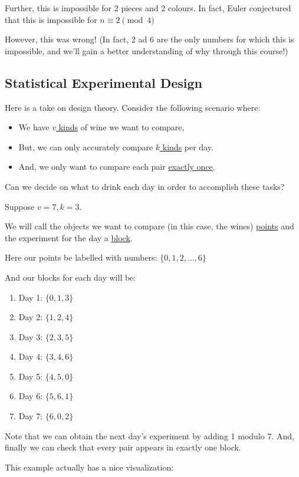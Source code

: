 Further, this is impossible for 2 pieces and 2 colours.
In fact, Euler conjectured that this is impossible for $n \equiv 2 \pmod{4}$

However, this was wrong! (In fact, 2 ad 6 are the only numbers for which this is impossible, and we'll gain a better understanding of why through this course!)

\subsection{Statistical Experimental Design}
Here is a take on design theory.
Consider the following scenario where:
\begin{itemize}
    \item We have \ul{$v$ kinds} of wine we want to compare,
    \item But, we can only accurately compare \ul{$k$ kinds} per day.
    \item And, we only want to compare each pair \ul{exactly once}.
\end{itemize}
Can we decide on what to drink each day in order to accomplish these tasks?

\begin{example}
    Suppose $v = 7, k = 3$.

    We will call the objects we want to compare (in this case, the wines) \ul{points} and the experiment for the day a \ul{block}.

    Here our points be labelled with numbers: $\{0, 1, 2, \ldots, 6\}$

    And our blocks for each day will be:
    \begin{enumerate}[label=]
        \item Day 1: $\{0, 1, 3\}$
        \item Day 2: $\{1, 2, 4\}$
        \item Day 3: $\{2, 3, 5\}$
        \item Day 4: $\{3, 4, 6\}$
        \item Day 5: $\{4, 5, 0\}$
        \item Day 6: $\{5, 6, 1\}$
        \item Day 7: $\{6, 0, 2\}$
    \end{enumerate}
    Note that we can obtain the next day's experiment by adding 1 modulo 7.
    And, finally we can check that every pair appears in exactly one block.
\end{example}
This example actually has a nice visualization:

